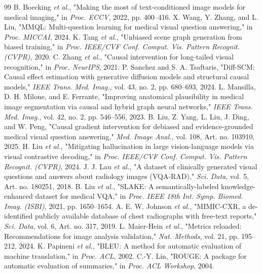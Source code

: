 \documentclass[journal,twoside,web]{ieeecolor}
\begin{document}
\begin{thebibliography}{99}
 B. Boecking \textit{et al.}, "Making the most of text-conditioned image models for medical imaging," in \textit{Proc. ECCV}, 2022, pp. 400--416.
 X. Wang, Y. Zhang, and L. Liu, "MMQL: Multi-question learning for medical visual question answering," in \textit{Proc. MICCAI}, 2024.
 K. Tang \textit{et al.}, "Unbiased scene graph generation from biased training," in \textit{Proc. IEEE/CVF Conf. Comput. Vis. Pattern Recognit. (CVPR)}, 2020.
 C. Zhang \textit{et al.}, "Causal intervention for long-tailed visual recognition," in \textit{Proc. NeurIPS}, 2021.
 P. Sanchez and S. A. Tsaftaris, "Diff-SCM: Causal effect estimation with generative diffusion models and structural causal models," \textit{IEEE Trans. Med. Imag.}, vol. 43, no. 2, pp. 680--693, 2024.
 L. Mansilla, D. H. Milone, and E. Ferrante, "Improving anatomical plausibility in medical image segmentation via causal and hybrid graph neural networks," \textit{IEEE Trans. Med. Imag.}, vol. 42, no. 2, pp. 546--556, 2023.
 B. Liu, Z. Yang, L. Liu, J. Ding, and W. Peng, "Causal gradient intervention for debiased and evidence-grounded medical visual question answering," \textit{Med. Image Anal.}, vol. 108, Art. no. 103910, 2025.
 H. Liu \textit{et al.}, "Mitigating hallucination in large vision-language models via visual contrastive decoding," in \textit{Proc. IEEE/CVF Conf. Comput. Vis. Pattern Recognit. (CVPR)}, 2024.
 J. J. Lau \textit{et al.}, "A dataset of clinically generated visual questions and answers about radiology images (VQA-RAD)," \textit{Sci. Data}, vol. 5, Art. no. 180251, 2018.
 B. Liu \textit{et al.}, "SLAKE: A semantically-labeled knowledge-enhanced dataset for medical VQA," in \textit{Proc. IEEE 18th Int. Symp. Biomed. Imag. (ISBI)}, 2021, pp. 1650--1654.
 A. E. W. Johnson \textit{et al.}, "MIMIC-CXR, a de-identified publicly available database of chest radiographs with free-text reports," \textit{Sci. Data}, vol. 6, Art. no. 317, 2019.
 L. Maier-Hein \textit{et al.}, "Metrics reloaded: Recommendations for image analysis validation," \textit{Nat. Methods}, vol. 21, pp. 195--212, 2024.
 K. Papineni \textit{et al.}, "BLEU: A method for automatic evaluation of machine translation," in \textit{Proc. ACL}, 2002.
 C.-Y. Lin, "ROUGE: A package for automatic evaluation of summaries," in \textit{Proc. ACL Workshop}, 2004.

\end{thebibliography}
\end{document}
